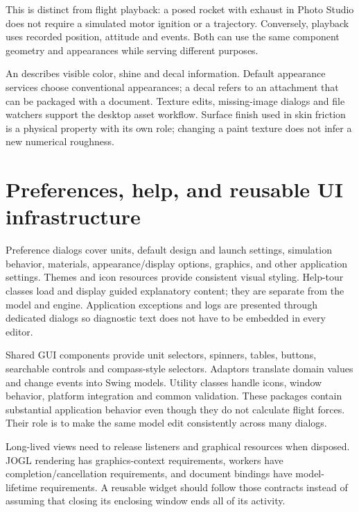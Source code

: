 This is distinct from flight playback: a posed rocket with exhaust in Photo Studio does not require a simulated motor ignition or a trajectory. Conversely, playback uses recorded position, attitude and events. Both can use the same component geometry and appearances while serving different purposes.

An  describes visible color, shine and decal information. Default appearance services choose conventional appearances; a decal refers to an attachment that can be packaged with a document. Texture edits, missing-image dialogs and file watchers support the desktop asset workflow. Surface finish used in skin friction is a physical property with its own role; changing a paint texture does not infer a new numerical roughness.


\section{Preferences, help, and reusable UI infrastructure}
Preference dialogs cover units, default design and launch settings, simulation behavior, materials, appearance/display options, graphics, and other application settings. Themes and icon resources provide consistent visual styling. Help-tour classes load and display guided explanatory content; they are separate from the model and engine. Application exceptions and logs are presented through dedicated dialogs so diagnostic text does not have to be embedded in every editor.

Shared GUI components provide unit selectors, spinners, tables, buttons, searchable controls and compass-style selectors. Adaptors translate domain values and change events into Swing models. Utility classes handle icons, window behavior, platform integration and common validation. These packages contain substantial application behavior even though they do not calculate flight forces. Their role is to make the same model edit consistently across many dialogs.

Long-lived views need to release listeners and graphical resources when disposed. JOGL rendering has graphics-context requirements, workers have completion/cancellation requirements, and document bindings have model-lifetime requirements. A reusable widget should follow those contracts instead of assuming that closing its enclosing window ends all of its activity.

